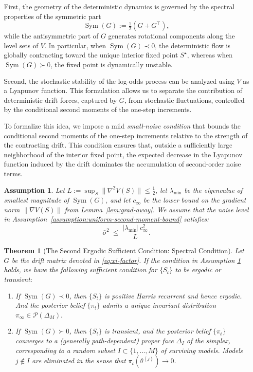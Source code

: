 \documentclass[12pt]{article}
\newtheorem{theorem}{Theorem}
\newtheorem{assumption}{Assumption}
\DeclareMathOperator{\Sym}{Sym}
\begin{document}
First, the geometry of the deterministic dynamics is governed by the spectral properties of the symmetric part
\[
\Sym(G) := \tfrac12(G+G^\top),
\]
while the antisymmetric part of $G$ generates rotational components along the level sets of $V$.
In particular, when $\Sym(G)\prec 0$, the deterministic flow is globally contracting toward the unique interior fixed point $S^\star$, whereas when $\Sym(G)\succ 0$, the fixed point is dynamically unstable.

Second, the stochastic stability of the log-odds process can be analyzed using $V$ as a Lyapunov function.
This formulation allows us to separate the contribution of deterministic drift forces, captured by $G$, from stochastic fluctuations, controlled by the conditional second moments of the one-step increments.

To formalize this idea, we impose a mild \emph{small-noise condition} that bounds the conditional second moments of the one-step increments relative to the strength of the contracting drift. This condition ensures that, outside a sufficiently large neighborhood of the interior fixed point, the expected decrease in the Lyapunov function induced by the drift dominates the accumulation of second-order noise terms. 

\begin{assumption}
    \label{as:small-noise}
    Let $L:=\sup_S\|\nabla^2 V(S)\|\le \tfrac12$, let $\lambda_{\min}$ be the eigenvalue of smallest magnitude of $\Sym(G)$, and let $c_\infty$ be the lower bound on the gradient norm $\|\nabla V(S)\|$ from Lemma~\ref{lem:grad-away}. We assume that the noise level in Assumption~\ref{assumption:uniform-second-moment-bound} satisfies:
    \[
    \bar\sigma^2 \;\leq\; \frac{|\lambda_{\min}|\, c_\infty^2}{L}.
    \]
\end{assumption}

\begin{theorem}[The Second Ergodic Sufficient Condition: Spectral Condition]
    \label{thm:sufficient-condition-ergodicity-transience}
    Let $G$ be the drift matrix denoted in \eqref{eq:xi-factor}. If the condition in Assumption \ref{as:small-noise} holds, we have the following sufficient condition for $\{S_t\}$ to be ergodic or transient:

    \begin{enumerate}
        \item If $\Sym(G)\prec 0$, then $\{S_t\}$ is positive Harris recurrent and hence ergodic. And the posterior belief $\{\pi_t\}$ admits a unique invariant distribution $\pi_\infty \in \mathcal{P}(\Delta_M)$.
        \item If $\Sym(G)\succ 0$, then $\{S_t\}$ is transient, and the posterior belief $\{\pi_t\}$ converges to a (generally path-dependent) proper face $\Delta_I$ of the simplex, corresponding to a random subset $I\subset\{1,\ldots,M\}$ of surviving models. Models $j\notin I$ are eliminated in the sense that $\pi_t(\theta^{(j)})\to 0$. 
    \end{enumerate}

\end{theorem}
\end{document}
